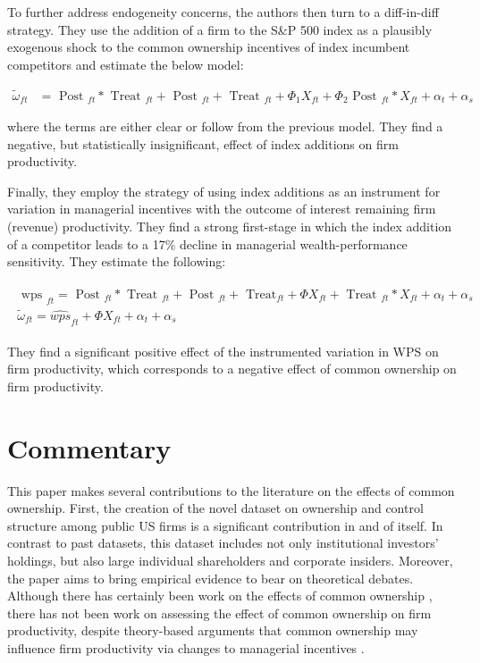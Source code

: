 \documentclass[12pt]{article}
\newif\ifdraft
\begin{document}
To further address endogeneity concerns, the authors then turn to 
a diff-in-diff strategy. They use the addition of a firm to the S\&P 500 index
as a plausibly exogenous shock to the common 
ownership incentives of index incumbent competitors and estimate the below model:
\vspace{-1em}

\begin{align}
    \widetilde{\omega}_{f t}&=\text { Post }_{f t} * \text { Treat }_{f t}+\text { Post }_{f t}+\text { Treat }_{f t}+\Phi_1 X_{f t}+\Phi_2 \text { Post }_{f t} * X_{f t}+\alpha_t+\alpha_s
\end{align}
\vspace{-1.5em}

where the terms are either clear or follow from the previous model.
They find a negative, but statistically insignificant, effect of 
index additions on firm productivity. 

Finally, they employ the strategy of using index additions as an instrument 
for variation in managerial incentives with the outcome of interest 
remaining firm (revenue) productivity. They find a strong first-stage 
in which 
the index addition of a competitor leads to a 17\% decline in 
managerial wealth-performance sensitivity. They estimate the following:

\begin{align}
    \begin{gathered}
        \text { wps }_{f t}=\text { Post }_{f t} * \text { Treat }_{f t}+\text { Post }_{f t}+\text { Treat}_{f t}+\Phi X_{f t}+\text { Treat }_{ft} * X_{f t}+\alpha_t+\alpha_s \\
        \widetilde{\omega}_{f t}=\widehat{w p s}_{f t}+\Phi X_{f t}+\alpha_t+\alpha_s
    \end{gathered}
\end{align}

They find a significant positive effect of the instrumented variation in 
WPS on firm productivity, 
which corresponds to a negative effect of common ownership on firm productivity.


\section{Commentary}

This paper makes several contributions to the literature on 
the effects of common ownership. First, the creation of the novel dataset 
on ownership and control structure among public US firms 
is a significant contribution in and of itself. In contrast to past datasets, 
this dataset includes not only institutional investors' holdings, but 
also large individual shareholders and corporate insiders. Moreover, the paper 
aims to bring empirical evidence to bear on theoretical debates.
Although there has certainly been work on the effects of 
common ownership 
\ifdraft(bas2023, anton2024, lopez2019) \else\parencite{bas2023, anton2024, lopez2019}\fi,
there has not been work on assessing the effect of common ownership on 
firm productivity, despite theory-based arguments that common ownership
may influence firm productivity via changes to managerial incentives
\ifdraft(anton2023) \else\parencite{anton2023}\fi.
\end{document}
